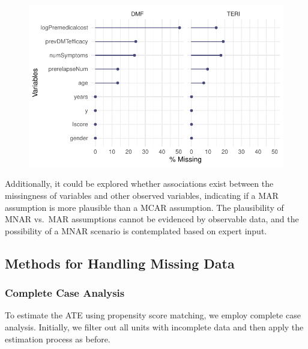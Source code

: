 \documentclass[
  letterpaper,
  DIV=11,
  numbers=noendperiod]{scrreprt}
\begin{document}
\begin{figure}[H]

{\centering \includegraphics{chapter_09_files/figure-pdf/hom miss exploration-2.pdf}

}

\end{figure}

Additionally, it could be explored whether associations exist between
the missingness of variables and other observed variables, indicating if
a MAR assumption is more plausible than a MCAR assumption. The
plausibility of MNAR vs.~MAR assumptions cannot be evidenced by
observable data, and the possibility of a MNAR scenario is contemplated
based on expert input.

\hypertarget{methods-for-handling-missing-data}{%
\subsection{Methods for Handling Missing
Data}\label{methods-for-handling-missing-data}}

\hypertarget{complete-case-analysis}{%
\subsubsection{Complete Case Analysis}\label{complete-case-analysis}}

To estimate the ATE using propensity score matching, we employ complete
case analysis. Initially, we filter out all units with incomplete data
and then apply the estimation process as before.
\end{document}

